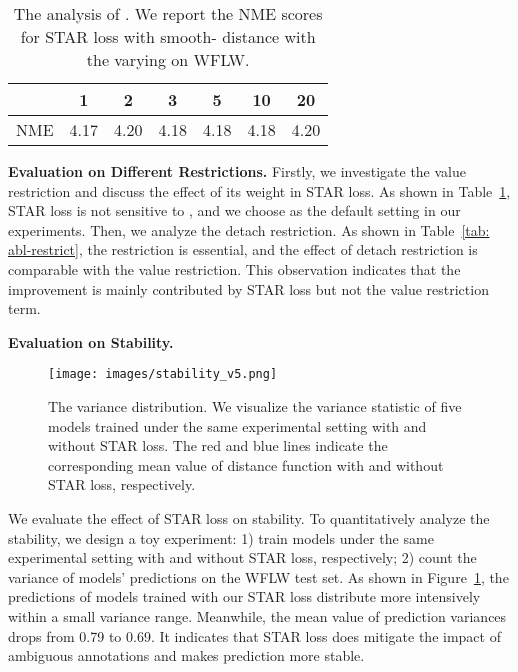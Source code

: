 \documentclass[10pt,twocolumn,letterpaper]{article}
\begin{document}
\begin{table}[]
\centering
\begin{tabular}{l|cccccc}
 & 1 & 2 & 3 & 5 & 10 & 20 \\
\hline
NME & 4.17 & 4.20 & 4.18 & 4.18 & 4.18 & 4.20 \\ 
\end{tabular}\vspace{-0.5em}
\caption{The analysis of . We report the NME scores for STAR loss with smooth- distance with the varying  on WFLW.}
\vspace{-0.5em}
\label{tab: abl-w}
\end{table}

\noindent\textbf{Evaluation on Different Restrictions.}
\label{sec: restrict}
Firstly, we investigate the value restriction and discuss the effect of its weight  in STAR loss.
As shown in Table~\ref{tab: abl-w}, STAR loss is not sensitive to , and we choose  as the default setting in our experiments.
Then, we analyze the detach restriction.
As shown in Table~\ref{tab: abl-restrict}, the restriction is essential, and the effect of detach restriction is comparable with the value restriction.
This observation indicates that the improvement is mainly contributed by STAR loss but not the value restriction term.


\noindent\textbf{Evaluation on Stability.}
\begin{figure}[t]
    \centering
    \texttt{[image: images/stability\_v5.png]}
    \vspace{-1.5em}
    \caption{
    The variance distribution. 
    We visualize the variance statistic of five models trained under the same experimental setting with and without STAR loss. 
    The {\color{red}red} and {\color{blue}blue} lines indicate the corresponding mean value of  distance function with and without STAR loss, respectively.}
    \vspace{-1.0em}
    \label{fig: stability}
\end{figure}
We evaluate the effect of STAR loss on stability.
To quantitatively analyze the stability, we design a toy experiment: 1) train  models under the same experimental setting with and without STAR loss, respectively; 2) count the variance of  models' predictions on the WFLW test set.
As shown in Figure~\ref{fig: stability}, the predictions of models trained with our STAR loss distribute more intensively within a small variance range.
Meanwhile, the mean value of prediction variances drops from 0.79 to 0.69.
It indicates that STAR loss does mitigate the impact of ambiguous annotations and makes prediction more stable.
\end{document}
